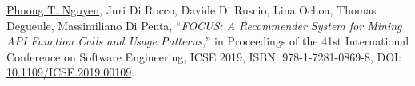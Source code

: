 \documentclass[a4paper,9pt]{article} %
\begin{document}
\begin{thebibliography}{100}
	
%		
%	
			
	\underline{Phuong T. Nguyen}, Juri Di Rocco, Davide Di Ruscio, Lina Ochoa, Thomas Degueule, Massimiliano Di Penta, ``\emph{FOCUS: A Recommender System for Mining API Function Calls and Usage Patterns},'' in Proceedings of the 41st International Conference on Software Engineering, ICSE 2019, ISBN: 978-1-7281-0869-8, DOI: \href{https://doi.org/10.1109/ICSE.2019.00109}{10.1109/ICSE.2019.00109}. %
	

\end{thebibliography}
\end{document}
